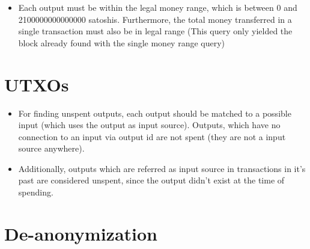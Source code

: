 \documentclass[12pt,a4paper]{article}
\begin{document}
\begin{itemize}
However, real bitcoin public keys always have a prefix byte with value 0x2, 0x3 or 0x4 [1].
So when using one's or two's complement to interpret negative numbers on little endian encoding [2] negative pks shouldn't be possible.
\newline
Sources:
\begin{verbatim}
  [1] https://steemit.com/bitcoin/@b1tma0/bitcoin-public-key-formats
  [2] http://learnmeabitcoin.com/glossary/little-endian
\end{verbatim}
\item Each output must be within the legal money range, which is between 0 and 2100000000000000 satoshis.\newline
Furthermore, the total money transferred in a single transaction must also be in legal range (This query only yielded the block already found with the single money range query)\newline
\end{itemize}

\section{UTXOs}
\begin{itemize}
\item For finding unspent outputs, each output should be matched to a possible input (which uses the output as input source).
Outputs, which have no connection to an input via output id are not spent (they are not a input source anywhere).
\item Additionally, outputs which are referred as input source in transactions in it's past are considered unspent,
since the output didn't exist at the time of spending.
\end{itemize}
\section{De-anonymization}
\end{document}
